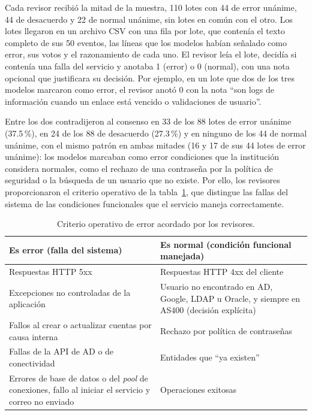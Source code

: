 Cada revisor recibió la mitad de la muestra, 110 lotes con 44 de error unánime, 44 de desacuerdo y 22 de normal unánime, sin lotes en común con el otro. Los lotes llegaron en un archivo CSV con una fila por lote, que contenía el texto completo de sus 50 eventos, las líneas que los modelos habían señalado como error, sus votos y el razonamiento de cada uno. El revisor leía el lote, decidía si contenía una falla del servicio y anotaba 1 (error) o 0 (normal), con una nota opcional que justificara su decisión. Por ejemplo, en un lote que dos de los tres modelos marcaron como error, el revisor anotó 0 con la nota ``son logs de información cuando un enlace está vencido o validaciones de usuario''.

Entre los dos contradijeron al consenso en 33 de los 88 lotes de error unánime (37.5\,\%), en 24 de los 88 de desacuerdo (27.3\,\%) y en ninguno de los 44 de normal unánime, con el mismo patrón en ambas mitades (16 y 17 de sus 44 lotes de error unánime): los modelos marcaban como error condiciones que la institución considera normales, como el rechazo de una contraseña por la política de seguridad o la búsqueda de un usuario que no existe. Por ello, los revisores proporcionaron el criterio operativo de la tabla~\ref{tab:met_criterio}, que distingue las fallas del sistema de las condiciones funcionales que el servicio maneja correctamente.

\begin{table}[H]
\centering
\caption{Criterio operativo de error acordado por los revisores.}
\label{tab:met_criterio}
\small
\begin{tabular}{@{}p{7.2cm}p{7.2cm}@{}}
\toprule
\textbf{Es error (falla del sistema)} & \textbf{Es normal (condición funcional manejada)} \\
\midrule
Respuestas HTTP 5xx & Respuestas HTTP 4xx del cliente \\
Excepciones no controladas de la aplicación & Usuario no encontrado en AD, Google, LDAP u Oracle, y siempre en AS400 (decisión explícita) \\
Fallos al crear o actualizar cuentas por causa interna & Rechazo por política de contraseñas \\
Fallas de la API de AD o de conectividad & Entidades que ``ya existen'' \\
Errores de base de datos o del \textit{pool} de conexiones, fallo al iniciar el servicio y correo no enviado & Operaciones exitosas \\
\bottomrule
\end{tabular}
\normalsize
\end{table}

